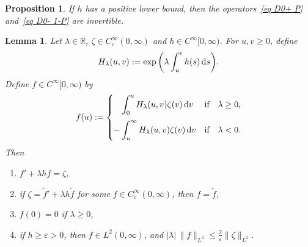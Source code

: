 \documentclass[10pt,a4paper]{amsart}
\numberwithin{equation}{section}
\newtheorem{Lemma}[Theorem]{Lemma}
\newtheorem{Proposition}[Theorem]{Proposition}
 { \theoremstyle{definition}
\newtheorem{Definition}[Theorem]{Definition}
\newtheorem{Note}[Theorem]{Note}
\newtheorem{Example}[Theorem]{Example}
\newtheorem{Remark}[Theorem]{Remark} }
\newcommand{\R}{\mathbb{R}}
\begin{document}
\begin{Proposition}\label{prop APS cusp}
If $h$ has a positive lower bound, then the operators~\eqref{eq D0+ P} and~\eqref{eq D0- 1-P} are invertible.
\end{Proposition}

\begin{Lemma}\label{lem f g}
Let $\lambda \in \R$, $\zeta \in C^{\infty}_c(0,\infty)$ and $h \in C^{\infty}[0,\infty)$. For $u,v\geq 0$, define
\[
H_{\lambda}(u,v) := \exp\bigg( \lambda \int_u^v h(s)\, {\rm d}s \bigg).
\]
Define $f \in C^{\infty}[0,\infty)$ by
\begin{equation} \label{eq def f}
f(u) :=
\begin{cases}
\displaystyle\phantom{-}\int_0^u H_{\lambda}(u,v)\zeta(v)\, {\rm d}v & \text{if\quad $\lambda \geq 0$},
\\[4mm]
\displaystyle-\int_u^{\infty} H_{\lambda}(u,v)\zeta(v)\, {\rm d}v & \text{if\quad $\lambda <0$}.
\end{cases}
\end{equation}
Then
\begin{enumerate}\itemsep=0pt
\item[$(1)$] $f'+\lambda h f = \zeta$,
\item[$(2)$] if $\zeta = \tilde f'+\lambda h \tilde f$ for some $f \in C^{\infty}_c(0, \infty)$, then $f = \tilde f$,
\item[$(3)$] $f(0) = 0$ if $\lambda \geq 0$,
\item[$(4)$] if $h \geq \varepsilon>0$, then
$f \in L^2(0,\infty)$, and $|\lambda|\, \|f\|_{L^2} \leq \frac{2}{\varepsilon}\|\zeta\|_{L^2}$.
\end{enumerate}
\end{Lemma}
\end{document}
